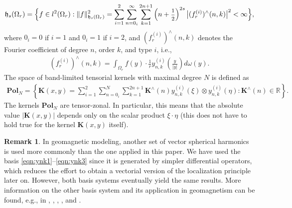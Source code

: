 \documentclass[a4paper, 10pt]{article}
\numberwithin{equation}{section}
\theoremstyle{definition}
\newtheorem{rem}[thm]{Remark}
\begin{document}
\begin{align}\label{eqn:sobspace2}
\mathfrak{h}_s(\Omega_r)=\Big\{f\in l^2(\Omega_r) :\|f\|_{\mathfrak{h}_s(\Omega_r)}^2=\sum_{i=1}^2\sum_{n=0_i}^\infty\sum_{k=1}^{2n+1}\left(n+\textnormal{\footnotesize$\frac{1}{2}$}\right)^{2s}\big|({f}_r^{(i)})^\wedge(n,k)\big|^2<\infty\Big\},
\end{align}
where $0_i=0$ if $i=1$ and $0_i=1$ if $i=2$, and $({f}_r^{(i)})^\wedge(n,k)$ denotes the Fourier coefficient of degree $n$, order $k$, and type $i$, i.e.,
\begin{align}
({f}_r^{(i)})^\wedge(n,k)=\int_{\Omega_r}f(y)\cdot \frac{1}{r}y_{n,k}^{(i)}\left(\frac{y}{|y|}\right)d\omega(y).
\end{align}
The space of band-limited tensorial kernels with maximal degree $N$ is defined as
\small\begin{align}\label{eqn:polnj2}
\mathbf{Pol}_{N}=\left\{\mathbf{K}(x,y)=\sum_{i=1}^2\sum_{n=0_i}^{N}\sum_{k=1}^{2n+1}\mathbf{K}^\wedge(n) {y}^{(i)}_{n,k}\left(\xi\right)\otimes{y}^{(i)}_{n,k}\left(\eta\right):\mathbf{K}^\wedge(n)\in\mathbb{R}\right\}.
\end{align}\normalsize
The kernels $\mathbf{Pol}_{N}$ are tensor-zonal. In particular, this means that the absolute value $|{\mathbf{K}}(x,y)|$ depends only on the scalar product $\xi\cdot\eta$ (this does not have to hold true for the kernel ${\mathbf{K}}(x,y)$ itself).

\begin{rem}
In geomagnetic modeling, another set of vector spherical harmonics is used more commonly than the one applied in this paper. We have used the basis \eqref{eqn:ynk1}--\eqref{eqn:ynk3} since it is generated by simpler differential operators, which reduces the effort to obtain a vectorial version of the localization principle later on. However, both basis systems eventually yield the same results. More information on the other basis system and its application in geomagnetism can be found, e.g., in \cite{backus96}, \cite{ger11}, \cite{ger12}, \cite{gubbins12}, and \cite{mayer06}.
\end{rem}
\end{document}
